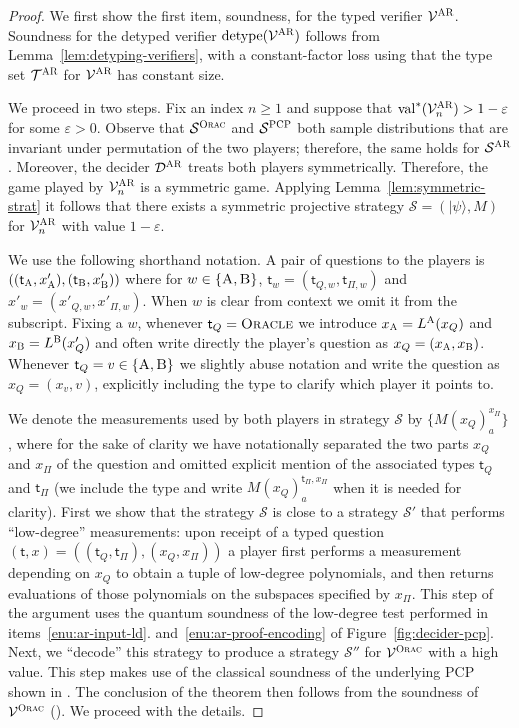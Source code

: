 \documentclass[11pt]{article}
\theoremstyle{definition}
\newcommand{\ket}[1]{|#1\rangle}
\newcommand{\val}{\ensuremath{\mathrm{val}}}
\newcommand{\eps}{\varepsilon}
\newcommand{\sampler}{\mathcal{S}}
\newcommand{\decider}{\mathcal{D}}
\newcommand{\verifier}{\mathcal{V}}
\newcommand{\strategy}{\mathscr{S}}
\newcommand{\detype}{\mathrm{detype}}
\newcommand{\type}{\mathcal{T}}
\newcommand{\gamestyle}[1]{\ensuremath{\textsc{#1}}\xspace}
\newcommand{\ora}{\gamestyle{Orac}}
\newcommand{\pcp}{\gamestyle{PCP}}
\newcommand{\ar}{\gamestyle{AR}}
\newcommand{\labelstyle}[1]{\ensuremath{\textsc{#1}}\xspace}
\newcommand{\tvarstyle}[1]{\mathsf{#1}}
\newcommand{\tvar}{\ensuremath{\tvarstyle{t}}}
\newcommand{\alice}{\labelstyle{A}}
\newcommand{\bob}{\labelstyle{B}}
\newcommand{\oracle}{\labelstyle{Oracle}}
\begin{document}
\begin{proof}
  We first show the first item, soundness, for the typed verifier
  $\verifier^\ar$.
  Soundness for the detyped verifier $\detype(\verifier^\ar)$ follows from
  Lemma~\ref{lem:detyping-verifiers}, with a constant-factor loss using that the
  type set $\type^\ar$ for $\verifier^\ar$ has constant size.
	
  We proceed in two steps.
  Fix an index $n\geq 1$ and suppose that $\val^*(\verifier_n^\ar) > 1-\eps$ for
  some $\eps > 0$.
  Observe that $\sampler^\ora$ and $\sampler^\pcp$ both sample distributions that
  are invariant under permutation of the two players; therefore, the same holds
  for $\sampler^\ar$.
  Moreover, the decider $\decider^\ar$ treats both players symmetrically.
  Therefore, the game played by $\verifier_n^\ar$ is a symmetric game.
  Applying Lemma~\ref{lem:symmetric-strat} it follows that there exists a
  symmetric projective strategy $\strategy = (\ket{\psi},M)$ for
  $\verifier^\ar_n$ with value $1 - \eps$.
	
  We use the following shorthand notation.
  A pair of questions to the players is
  $((\tvar_\alice,x'_\alice),(\tvar_\bob,x'_\bob))$ where for
  $w\in\{\alice,\bob\}$, $\tvar_w=(\tvar_{Q,w},\tvar_{\Pi,w})$ and
  $x'_w=(x'_{Q,w}, x'_{\Pi,w})$.
  When $w$ is clear from context we omit it from the subscript.
  Fixing a $w$, whenever $\tvar_Q = \oracle$ we introduce $x_\alice =
  L^\alice(x_Q)$ and $x_\bob =L^\bob(x'_Q)$ and often write directly the player's
  question as $x_Q = (x_\alice,x_\bob)$.
  Whenever $\tvar_Q=v \in \{\alice,\bob\}$ we slightly abuse notation and write
  the question as $x_Q = (x_{v},v)$, explicitly including the type to clarify
  which player it points to.
	
  We denote the measurements used by both players in strategy $\strategy$ by
  $\{M({x}_Q)^{ {x}_{\Pi}}_{a}\}$, where for the sake of clarity we have
  notationally separated the two parts ${x}_Q$ and $x_\Pi$ of the question and
  omitted explicit mention of the associated types $\tvar_Q$ and $\tvar_\Pi$ (we
  include the type and write $M({x}_Q)^{\tvar_\Pi, {x}_{\Pi}}_{a}$ when it is
  needed for clarity).
  First we show that the strategy $\strategy$ is close to a strategy
  $\strategy'$ that performs ``low-degree'' measurements: upon receipt of a
  typed question $(\tvar,x)=((\tvar_Q,\tvar_\Pi),({x}_Q,x_\Pi))$ a player first
  performs a measurement depending on ${x}_Q$ to obtain a tuple of low-degree
  polynomials, and then returns evaluations of those polynomials on the
  subspaces specified by $x_\Pi$.
  This step of the argument uses the quantum soundness of the low-degree test
  performed in items~\ref{enu:ar-input-ld}.
  and~\ref{enu:ar-proof-encoding} of Figure~\ref{fig:decider-pcp}.
  Next, we ``decode'' this strategy to produce a strategy $\strategy''$ for
  $\verifier^\ora$ with a high value.
  This step makes use of the classical soundness of the underlying PCP shown in
  .
  The conclusion of the theorem then follows from the soundness of
  $\verifier^\ora$ ().
  We proceed with the details.


\end{proof}
\end{document}
